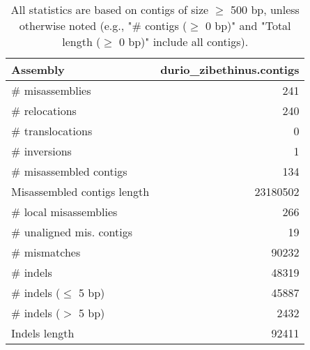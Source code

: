 \documentclass[12pt,a4paper]{article}
\begin{document}
\begin{table}[ht]
\begin{center}
\caption{All statistics are based on contigs of size $\geq$ 500 bp, unless otherwise noted (e.g., "\# contigs ($\geq$ 0 bp)" and "Total length ($\geq$ 0 bp)" include all contigs).}
\begin{tabular}{|l*{1}{|r}|}
\hline
Assembly & durio\_zibethinus.contigs \\ \hline
\# misassemblies & 241 \\ \hline
\hspace{5mm}\# relocations & 240 \\ \hline
\hspace{5mm}\# translocations & 0 \\ \hline
\hspace{5mm}\# inversions & 1 \\ \hline
\# misassembled contigs & 134 \\ \hline
Misassembled contigs length & 23180502 \\ \hline
\# local misassemblies & 266 \\ \hline
\# unaligned mis. contigs & 19 \\ \hline
\# mismatches & 90232 \\ \hline
\# indels & 48319 \\ \hline
\hspace{5mm}\# indels ($\leq$ 5 bp) & 45887 \\ \hline
\hspace{5mm}\# indels ($>$ 5 bp) & 2432 \\ \hline
Indels length & 92411 \\ \hline
\end{tabular}
\end{center}
\end{table}
\end{document}
